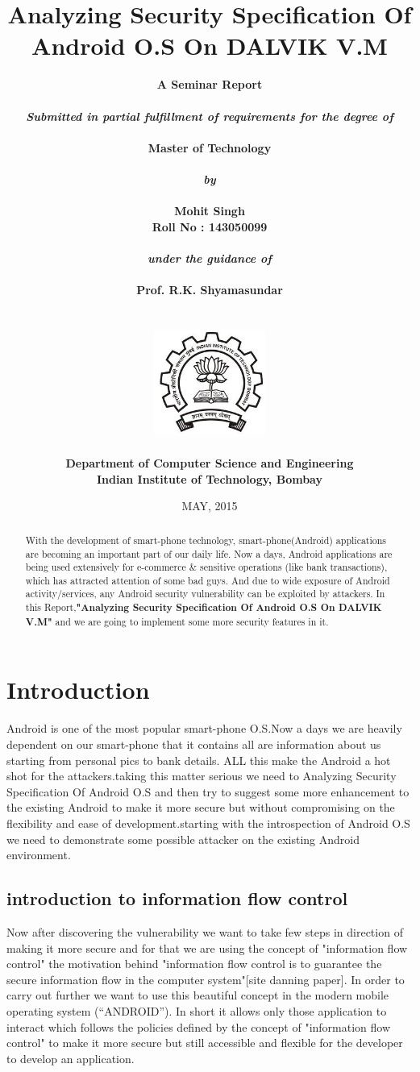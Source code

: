 \documentclass[11pt]{report}
\title{\textbf{Analyzing Security Specification Of Android O.S On DALVIK V.M}}
\author{\bf{A Seminar Report}\\
        \\
        \emph{Submitted in partial fulfillment of requirements for the degree of}\\
        \\
        \bf{Master of Technology}\\
        \\
        \emph{by}\\
        \\
		\bf{Mohit Singh}\\
        \bf{Roll No : 143050099}\\
        \\
        \emph{under the guidance of}\\
        \\
        \bf{Prof. R.K. Shyamasundar}\\
        \\\\
        \includegraphics[height=3.5cm]{./images/iitb_logo}\\
        \\
        \bf{Department of Computer Science and Engineering}\\
        \bf{Indian Institute of Technology, Bombay}\\
}
\date{MAY, 2015}
\begin{document}
\maketitle
{}
\tableofcontents
\begin{abstract}
With the development of smart-phone technology, smart-phone(Android) applications are becoming an important part of our daily life. Now a days,
Android applications are being used  extensively for e-commerce \& sensitive operations (like bank transactions), 
which has attracted attention of some bad guys. And due to wide exposure of Android activity/services,
any Android security vulnerability can be exploited by attackers. In this Report,\textbf{"Analyzing Security Specification Of Android O.S On DALVIK V.M"} and we are going to implement some more 
security features in it.
\end{abstract}




\chapter{Introduction}
\label{chapter:intro}
Android is one of the most popular smart-phone O.S.Now a days we are heavily dependent on our smart-phone that it contains all are information about us starting from  personal pics to bank details.
ALL this make the Android a hot shot for the attackers.taking this matter serious we need to Analyzing Security Specification Of Android O.S and then try to suggest some more enhancement to the existing Android
to make it more secure but without compromising on the flexibility and ease of development.starting with the introspection of Android O.S we need to demonstrate some possible attacker on the existing Android environment.
\section{introduction  to information flow control} 
Now after discovering the vulnerability we want to take few steps in direction of making it more secure and for that we are using the concept of "information flow control"
the motivation behind "information flow control is to guarantee the secure information flow in the computer system"[site danning paper].
In order to carry out further we want to use this beautiful concept in the modern mobile operating system (“ANDROID”).
In short it allows only those application to interact which follows the policies defined by the concept of "information flow control" to make it more secure but still accessible and flexible for the developer to develop an application.
\end{document}
